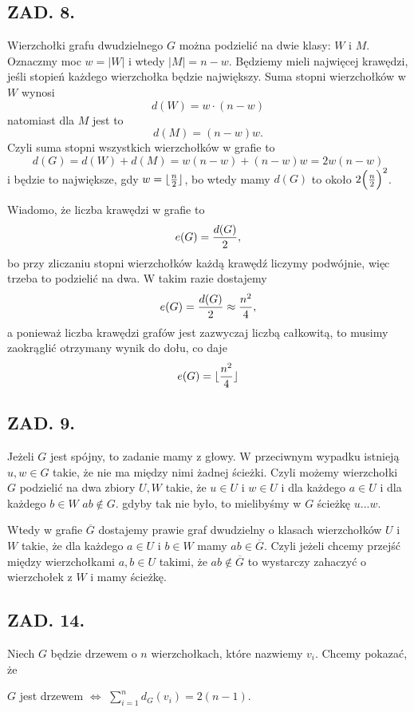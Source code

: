 \documentclass{article}
\begin{document}
    \subsection*{ZAD. 8.}

    Wierzchołki grafu dwudzielnego $G$ można podzielić na dwie klasy: $W$ i $M$. Oznaczmy moc $w=|W|$ i wtedy $|M|=n-w$. Będziemy mieli najwięcej krawędzi, jeśli stopień każdego wierzchołka będzie największy. Suma stopni wierzchołków w $W$ wynosi
    $$d(W)=w\cdot(n-w)$$
    natomiast dla $M$ jest to
    $$d(M)=(n-w)w.$$
    Czyli suma stopni wszystkich wierzchołków w grafie to
    $$d(G)=d(W)+d(M)=w(n-w)+(n-w)w=2w(n-w)$$
    i będzie to największe, gdy $w=\lfloor {n\over2}\rfloor$, bo wtedy mamy $d(G)$ to około $2\Big({n\over2}\Big)^2$.

    Wiadomo, że liczba krawędzi w grafie to
    $$e(G)={d(G)\over2},$$
    bo przy zliczaniu stopni wierzchołków każdą krawędź liczymy podwójnie, więc trzeba to podzielić na dwa. W takim razie dostajemy
    $$e(G)={d(G)\over 2}\approx{n^2\over4},$$
    a ponieważ liczba krawędzi grafów jest zazwyczaj liczbą całkowitą, to musimy zaokrąglić otrzymany wynik do dołu, co daje
    $$e(G)=\lfloor{n^2\over4}\rfloor$$
    
    \subsection*{ZAD. 9.}

    Jeżeli $G$ jest spójny, to zadanie mamy z głowy. W przeciwnym wypadku istnieją $u,w\in G$ takie, że nie ma między nimi żadnej ścieżki. Czyli możemy wierzchołki $G$ podzielić na dwa zbiory $U,W$ takie, że $u\in U$ i $w\in U$ i dla każdego $a\in U$ i dla każdego $b\in W$ $ab\notin G$. gdyby tak nie było, to mielibyśmy w $G$ ścieżkę $u...w$.
    
    Wtedy w grafie $\overline G$ dostajemy prawie graf dwudzielny o klasach wierzchołków $U$ i $W$ takie, że dla każdego $a\in U$ i $b\in W$ mamy $ab\in \overline G$. Czyli jeżeli chcemy przejść między wierzchołkami $a,b\in U$ takimi, że $ab\notin\overline G$ to wystarczy zahaczyć o wierzchołek z $W$ i mamy ścieżkę.

    \subsection*{ZAD. 14.}
    Niech $G$ będzie drzewem o $n$ wierzchołkach, które nazwiemy $v_i$. Chcemy pokazać, że

    \begin{center}
    $G$ jest drzewem $\iff$ $\sum\limits_{i=1}^nd_G(v_i)=2(n-1)$.
    \end{center}
\end{document}
